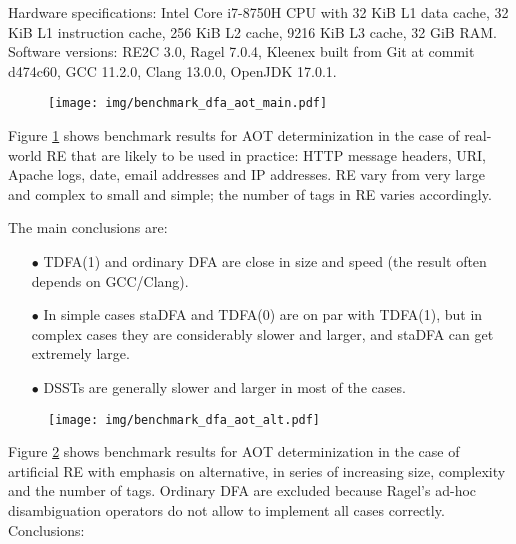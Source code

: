 \documentclass[]{article}
\begin{document}
Hardware specifications:
Intel Core i7-8750H CPU with
32 KiB L1 data cache,
32 KiB L1 instruction cache,
256 KiB L2 cache,
9216 KiB L3 cache,
32 GiB RAM.
%
Software versions:
RE2C 3.0,
Ragel 7.0.4,
Kleenex built from Git at commit d474c60,
GCC 11.2.0,
Clang 13.0.0,
OpenJDK 17.0.1.
\medskip

\pagebreak

\begin{figure}[t!]
\texttt{[image: img/benchmark\_dfa\_aot\_main.pdf]}
\label{fig:benchmark_dfa_aot_main}
\medskip
\end{figure}

Figure \ref{fig:benchmark_dfa_aot_main} shows benchmark results for AOT determinization
in the case of real-world RE that are likely to be used in practice:
HTTP message headers, URI, Apache logs, date, email addresses and IP addresses.
RE vary from very large and complex to small and simple;
the number of tags in RE varies accordingly.
\medskip

The main conclusions are:
\medskip

\begin{itemize}

\item[$\bullet$]
TDFA(1) and ordinary DFA are close in size and speed (the result often depends on GCC/Clang).
\medskip

\item[$\bullet$]
In simple cases staDFA and TDFA(0) are on par with TDFA(1),
but in complex cases they are considerably slower and larger,
and staDFA can get extremely large.
\medskip

\item[$\bullet$]
DSSTs are generally slower and larger in most of the cases.

\end{itemize}

\pagebreak

\begin{figure}[t!]
\texttt{[image: img/benchmark\_dfa\_aot\_alt.pdf]}
\label{fig:benchmark_dfa_aot_alt}
\medskip
\end{figure}

Figure \ref{fig:benchmark_dfa_aot_alt} shows benchmark results for AOT determinization
in the case of artificial RE with emphasis on alternative, in series of increasing size, complexity and the number of tags.
Ordinary DFA are excluded because Ragel's ad-hoc disambiguation operators do not allow to implement all cases correctly.
Conclusions:
\medskip
\end{document}
